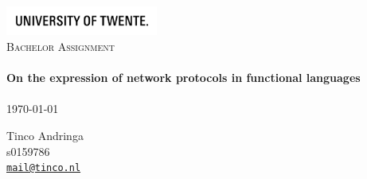 \begin{titlepage}

\begin{center}

\includegraphics[width=50mm]{UT_Logo_Black_EN.jpg}\\[1.5cm]
\textsc{\Large Bachelor Assignment}\\[0.5cm]
\HRule \\[0.4cm]
{ \huge \bfseries On the expression of network protocols in functional languages}\\[0.4cm]
\HRule \\[1.5cm]
{\large \today}
\vfill
\begin{minipage}{0.4\textwidth}
\begin{flushleft} \large
Tinco Andringa\\
s0159786\\
\href{mailto:mail@tinco.nl}{\nolinkurl{mail@tinco.nl}} \\[0.5cm]
\end{flushleft}
\end{minipage}
\end{center}
\end{titlepage}
